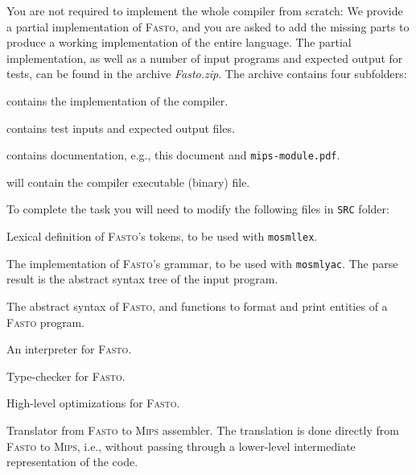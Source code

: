 \documentclass[a4paper,11pt]{article}
\newcommand{\comm}[2]{{\sf \(\spadesuit\){\bf #1: }{\rm \sf #2}\(\spadesuit\)}}
\newcommand{\mcomm}[2]{\marginpar{\scriptsize \comm{#1}{#2}}}
\newcommand{\jbcomment}[1]{\mcomm{JB}{#1}}
\newcommand{\fasto}{\textsc{Fasto}\xspace}
\newcommand{\mips}{\textsc{Mips}\xspace}
\begin{document}
You are not required to implement the whole compiler from scratch:
We provide a partial implementation of \fasto, 
and you are asked to add the missing parts to produce a working
implementation of the entire language.
%
The partial implementation, as well as a number of input programs 
and expected output for tests, can be found in the archive \emph{Fasto.zip}.
The archive contains four subfolders: 
\begin{description}
\setlength{\itemsep}{0.1ex}

\item[{\tt SRC/}:] contains the implementation of the compiler.

\item[{\tt DATA/}:] contains test inputs and expected output files.

\item[{\tt DOC/}:] contains documentation, e.g., this document and {\tt mips-module.pdf}.

\item[{\tt BIN/}:] will contain the compiler executable (binary) file.

\end{description}

To complete the task you will need to modify the following files in {\tt SRC} folder:
 
\begin{description}
\setlength{\itemsep}{0.1ex}

\item[{\tt Lexer.lex}:] Lexical definition of \fasto's tokens, to be used with \texttt{mosmllex}. 

\item[{\tt Parser.grm}:] The implementation of \fasto's grammar, 
	to be used with \texttt{mosmlyac}. 
	The parse result is the abstract syntax tree of the input program.

\item[{\tt Fasto.sml}:] The abstract syntax of \fasto, 
       and functions to format and print entities of a \fasto program.

\item[{\tt Interpret.sml}:] An interpreter for \fasto.

\item[{\tt Type.sml}:] Type-checker for \fasto.

\item[{\tt Optimization.sml}] High-level optimizations for \fasto.

\item[{\tt Compiler.sml}:] Translator from \fasto to \mips assembler.
    The translation is done directly from \fasto to \mips, i.e., without 
        passing through a lower-level intermediate representation of the code.

\end{description}
\end{document}
